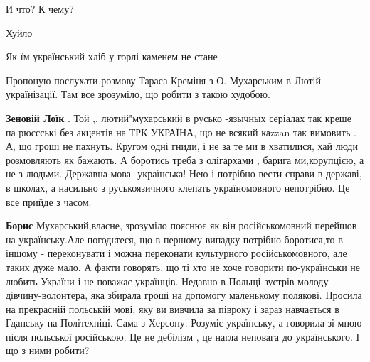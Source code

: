 \begin{itemize}
И что? К чему?

 
Хуйло

 
Як їм український хліб у горлі каменем не стане

 

Пропоную послухати розмову Тараса Креміня з О. Мухарським в Лютій українізації.
Там все зрозуміло, що робити з такою худобою.

\begin{itemize}
 
\textbf{Зеновій Лоїк} . Той ,, лютий"мухарський в русько -язычных серіалах так креше па рюссські без акцентів на ТРК УКРАЇНА, що не всякий каzzan так вимовить .
А, що гроші не пахнуть.
Кругом одні гниди, і не за те ми в хватилися, хай люди розмовляють як бажають. А боротись треба з олігархами , барига ми,корупцією, а не з людьми.
Державна мова -українська! Нею і потрібно вести справи в державі, в школах, а насильно з руськоязичного клепать україномовного непотрібно. Це все прийде з часом.

 
\textbf{Борис} 
Мухарський,власне, зрозуміло пояснює як він російськомовний перейшов на
українську.Але погодьтеся, що в першому випадку потрібно боротися,то в іншому -
переконувати і можна переконати культурного російськомовного, але таких дуже
мало. А факти говорять, що ті хто не хоче говорити по-українськи не любить
України і не поважає українців. Недавно в Польщі зустрів молоду
дівчину-волонтера, яка збирала гроші на допомогу маленькому полякові. Просила
на прекрасній польській мові, яку ви вивчила за півроку і зараз навчається в
Гданську на Політехніці. Сама з Херсону. Розуміє українську, а говорила зі мною
після польської російською. Це не дебілізм , це нагла неповага до українського.
І що з ними робити?


\end{itemize}
\end{itemize}
